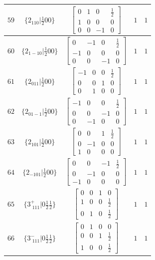 \documentclass[fleqn,8pt]{jsarticle}
\begin{document}
\begin{longtable}{ccccc}
$ 59 $ & $ \{2{}_{110}|\frac{1}{2} 0 0\} $ & $ \begin{bmatrix} 0 & 1 & 0 & \frac{1}{2} \\ 1 & 0 & 0 & 0 \\ 0 & 0 & -1 & 0 \end{bmatrix} $ & $ 1 $ & $ 1 $ \\ \hline
$ 60 $ & $ \{2{}_{1-10}|\frac{1}{2} 0 0\} $ & $ \begin{bmatrix} 0 & -1 & 0 & \frac{1}{2} \\ -1 & 0 & 0 & 0 \\ 0 & 0 & -1 & 0 \end{bmatrix} $ & $ 1 $ & $ 1 $ \\ \hline
$ 61 $ & $ \{2{}_{011}|\frac{1}{2} 0 0\} $ & $ \begin{bmatrix} -1 & 0 & 0 & \frac{1}{2} \\ 0 & 0 & 1 & 0 \\ 0 & 1 & 0 & 0 \end{bmatrix} $ & $ 1 $ & $ 1 $ \\ \hline
$ 62 $ & $ \{2{}_{01-1}|\frac{1}{2} 0 0\} $ & $ \begin{bmatrix} -1 & 0 & 0 & \frac{1}{2} \\ 0 & 0 & -1 & 0 \\ 0 & -1 & 0 & 0 \end{bmatrix} $ & $ 1 $ & $ 1 $ \\ \hline
$ 63 $ & $ \{2{}_{101}|\frac{1}{2} 0 0\} $ & $ \begin{bmatrix} 0 & 0 & 1 & \frac{1}{2} \\ 0 & -1 & 0 & 0 \\ 1 & 0 & 0 & 0 \end{bmatrix} $ & $ 1 $ & $ 1 $ \\ \hline
$ 64 $ & $ \{2{}_{-101}|\frac{1}{2} 0 0\} $ & $ \begin{bmatrix} 0 & 0 & -1 & \frac{1}{2} \\ 0 & -1 & 0 & 0 \\ -1 & 0 & 0 & 0 \end{bmatrix} $ & $ 1 $ & $ 1 $ \\ \hline
$ 65 $ & $ \{3^{+}_{\,\,111}|0 \frac{1}{2} \frac{1}{2}\} $ & $ \begin{bmatrix} 0 & 0 & 1 & 0 \\ 1 & 0 & 0 & \frac{1}{2} \\ 0 & 1 & 0 & \frac{1}{2} \end{bmatrix} $ & $ 1 $ & $ 1 $ \\ \hline
$ 66 $ & $ \{3^{-}_{\,\,111}|0 \frac{1}{2} \frac{1}{2}\} $ & $ \begin{bmatrix} 0 & 1 & 0 & 0 \\ 0 & 0 & 1 & \frac{1}{2} \\ 1 & 0 & 0 & \frac{1}{2} \end{bmatrix} $ & $ 1 $ & $ 1 $ \\ \hline

\end{longtable}
\end{document}
